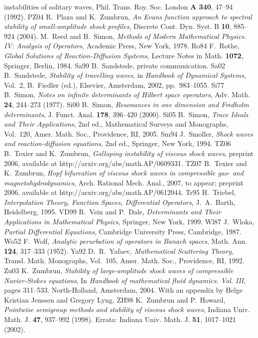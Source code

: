 \begin{thebibliography}{99}
{instabilities of solitary waves}, Phil. Trans. Roy. Soc. London {\bf
A 340}, 47--94 (1992).
{\bibitem}{PZ04} R.\ Plaza and K.\ Zumbrun, {\it An Evans function approach
to spectral stability of small-amplitude shock profiles}, Discrete
Cont. Dyn. Syst. B {\bf  10}, 885--924 (2004).
 M.\ Reed and B.\ Simon,
{\em Methods of Modern Mathematical Physics. IV:
Analysis of Operators,} Academic Press, New York, 1978.
{\bibitem}{Ro84} F.\ Rothe, {\it Global Solutions of Reaction-Diffusion
Systems}, Lecture Notes in Math. {\bf 1072}, Springer, Berlin, 1984.
{\bibitem}{Sa99} B.\ Sandstede, private communication.
{\bibitem}{Sa02} B.\ Sandstede, {\it Stability of travelling waves}, in {\it
Handbook of
Dynamical Systems}, Vol.\ 2, B.\ Fiedler (ed.), Elsevier, Amsterdam,
2002, pp.\ 983--1055.
{\bibitem}{Si77} B.\ Simon, {\it Notes on infinite determinants of Hilbert space
operators}, Adv. Math. {\bf 24}, 244--273 (1977).
{\bibitem}{Si00} B.\ Simon, {\it Resonances in one dimension and Fredholm
determinants}, J. Funct. Anal. {\bf 178}, 396--420 (2000).
{\bibitem}{Si05} B.\ Simon, {\it Trace Ideals and Their Applications}, 2nd ed.,
Mathematical Surveys and Monographs, Vol.\ 120, Amer. Math. Soc.,
Providence, RI, 2005.
{\bibitem}{Sm94} J.\ Smoller, {\it Shock waves and reaction-diffusion
equations}, 2nd ed., Springer, New York, 1994.
{\bibitem}{TZ06} B.\ Texier and K.\ Zumbrun,
{\it Galloping instability of viscous shock waves},
preprint 2006, available at http://arxiv.org/abs/math.AP/0609331.
{\bibitem}{TZ07} B.\ Texier and K.\ Zumbrun,
{\it Hopf bifurcation of viscous shock waves in
compressible gas- and magnetohydrodynamics},
Arch. Rational Mech. Anal., 2007, to appear;
preprint 2006, available at http://arxiv.org/abs/math.AP/0612044.
{\bibitem}{Tr95} H.\ Triebel, {\it Interpolation Theory, Function Spaces, Differential 
Operators}, J.\ A.\ Barth, Heidelberg, 1995. 
{\bibitem}{VD99} R.\ Vein and P.\ Dale, {\it Determinants and Their
Applications in Mathematical Physics}, Springer, New York, 1999.
{\bibitem}{Wl87} J.\ Wloka, {\it Partial Differential Equations}, Cambridge University 
Press, Cambridge, 1987.
{\bibitem}{Wo52} F.\ Wolf, {\it Analytic perurbation of operators in Banach
spaces}, Math. Ann. {\bf 124}, 317--333 (1952).
{\bibitem}{Ya92} D.\ R.\ Yafaev, {\em Mathematical Scattering Theory},
Transl. Math. Monographs,  Vol.\ 105, Amer. Math. Soc.,
Providence, RI, 1992.
{\bibitem}{Zu03} K.\ Zumbrun, {\it Stability of large-amplitude shock
waves of compressible {N}avier-{S}tokes equations},
In {\em Handbook of mathematical fluid dynamics. Vol.  III}, pages
311--533. North-Holland, Amsterdam, 2004.
With an appendix by Helge Kristian Jenssen and Gregory Lyng.
{\bibitem}{ZH98} K.\ Zumbrun and P.\ Howard, {\it Pointwise semigroup methods and
stability of viscous shock waves}, Indiana Univ. Math. J. {\bf 47},
937--992 (1998). Errata: Indiana Univ. Math. J. {\bf 51}, 1017--1021 (2002).
\end{thebibliography}


